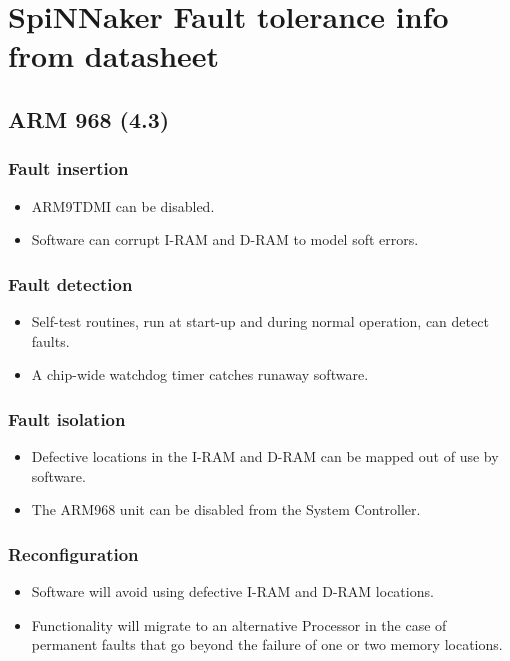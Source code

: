 \documentclass[oneside, a4paper, 11pt]{memoir}
\newenvironment{itmz}{
	\begin{itemize}
		\setlength{\itemsep}{0pt}
		\setlength{\parskip}{0pt}
	}{\end{itemize}}
\begin{document}
\frontmatter
\tableofcontents

\mainmatter
{}

\chapter{SpiNNaker Fault tolerance info from datasheet}
\section{ARM 968 (4.3)}
\subsection*{Fault insertion}
\begin{itmz}
\item ARM9TDMI can be disabled.
\item Software can corrupt I-RAM and D-RAM to model soft errors.
\end{itmz}
\subsection*{Fault detection}
\begin{itmz}
\item Self-test routines, run at start-up and during normal operation, can detect faults.
\item A chip-wide watchdog timer catches runaway software.
\end{itmz}
\subsection*{Fault isolation}
\begin{itmz}
\item Defective locations in the I-RAM and D-RAM can be mapped out of use by software.
\item The ARM968 unit can be disabled from the System Controller.
\end{itmz}
\subsection*{Reconfiguration}
\begin{itmz}
\item Software will avoid using defective I-RAM and D-RAM locations.
\item Functionality will migrate to an alternative Processor in the case of permanent faults that go
beyond the failure of one or two memory locations.
\end{itmz}
\end{document}
